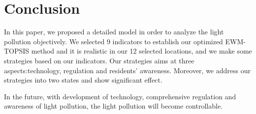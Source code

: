 \MinParskip{}

\section{Conclusion}

In this paper, we proposed a detailed model in order to analyze the light pollution objectively. We selected 9 indicators to establish our optimized EWM-TOPSIS method and it is realistic in our 12 selected locations, and we make some strategies based on our indicators. Our strategies aims at three aspects:technology, regulation and residents' awareness. Moreover, we address our strategies into two states and show significant effect.

In the future, with development of technology, comprehensive regulation and awareness of light pollution, the light pollution will become controllable.
